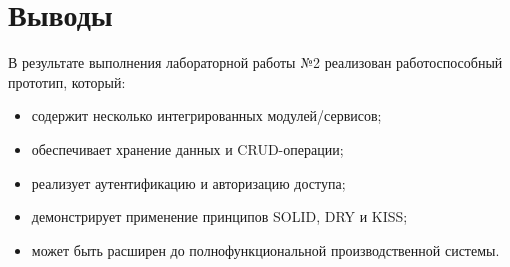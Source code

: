 \documentclass[14pt,a4paper]{extarticle}
\begin{document}
\section{Выводы}
В результате выполнения лабораторной работы №2 реализован работоспособный прототип, который:
\begin{itemize}
    \item содержит несколько интегрированных модулей/сервисов;
    \item обеспечивает хранение данных и CRUD-операции;
    \item реализует аутентификацию и авторизацию доступа;
    \item демонстрирует применение принципов SOLID, DRY и KISS;
    \item может быть расширен до полнофункциональной производственной системы.
\end{itemize}
\end{document}
